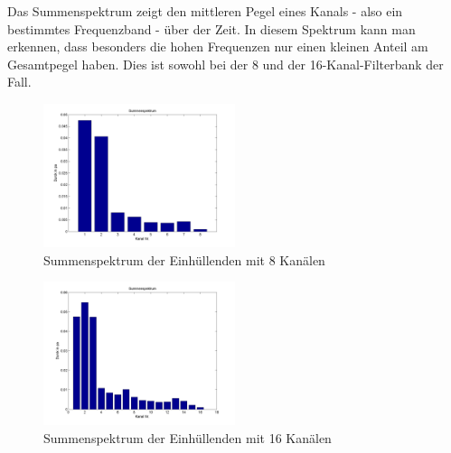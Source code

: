 \documentclass[conference]{IEEEtran}
\begin{document}
\begin{compactenum}[a)]
\newpage
Das Summenspektrum zeigt den mittleren Pegel eines Kanals - also ein bestimmtes Frequenzband - über der Zeit. In diesem Spektrum kann man erkennen, dass besonders die hohen Frequenzen nur einen kleinen Anteil am Gesamtpegel haben. Dies ist sowohl bei der 8 und der 16-Kanal-Filterbank der Fall.
\begin{figure}[h!]
	\vspace{-5pt}
	\centering
	\includegraphics[width=0.5\textwidth]{img/sum_ch8.png}
	\vspace{-10pt}
	\caption{Summenspektrum der Einhüllenden mit 8 Kanälen}
	\vspace{-10pt}
	\label{fig:sum_env8}
\end{figure}

\begin{figure}[h!]
	\vspace{-5pt}
	\centering
	\includegraphics[width=0.5\textwidth]{img/sum_ch16.png}
	\vspace{-10pt}
	\caption{Summenspektrum der Einhüllenden mit 16 Kanälen}
	\vspace{-10pt}
	\label{fig:sum_env8}
\end{figure}
\end{compactenum}

\clearpage
\end{document}
